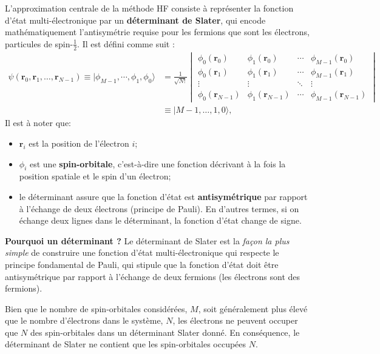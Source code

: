 \documentclass[12pt,a4paper]{article} %
\numberwithin{equation}{section} %
\numberwithin{figure}{section} %
\numberwithin{table}{section} %
\begin{document}
L'approximation centrale de la méthode HF consiste à représenter la fonction d'état multi-électronique par un \textbf{déterminant de Slater}, qui encode mathématiquement l'antisymétrie requise pour les fermions que sont les électrons, particules de spin-$\frac12$. Il est défini comme suit :
\begin{equation}
\begin{split}
\psi(\mathbf{r}_0, \mathbf{r}_1, \ldots, \mathbf{r}_{N-1})\equiv |\phi_{M-1},\cdots,  \phi_1, \phi_0 \rangle 
&=   \frac{1}{\sqrt{N!}}
\begin{vmatrix} \phi_0(\mathbf{r}_0) & \phi_1(\mathbf{r}_0) & \cdots & \phi_{M-1}(\mathbf{r}_0) \\
      \phi_0(\mathbf{r}_1) & \phi_1(\mathbf{r}_1) & \cdots & \phi_{M-1}(\mathbf{r}_1) \\
      \vdots & \vdots & \ddots & \vdots \\
      \phi_0(\mathbf{r}_{N-1}) & \phi_1(\mathbf{r}_{N-1}) & \cdots & \phi_{M-1}(\mathbf{r}_{N-1})
\end{vmatrix} \\
&\equiv |M-1,\dots, 1, 0 \rangle,
\end{split}
\end{equation} 
Il est à noter que:
\begin{itemize}
\item $\mathbf{r}_i$ est la position de l'électron $i$;
\item $\phi_i$ est une \textbf{spin-orbitale}, c'est-à-dire une fonction décrivant à la fois la position spatiale et le spin d'un électron;
\item le déterminant assure que la fonction d'état est \textbf{antisymétrique} par rapport à l'échange de deux électrons (principe de Pauli). En d'autres termes, si on échange deux lignes dans le déterminant, la fonction d'état change de signe.
\end{itemize}

\textbf{Pourquoi un déterminant ?} Le déterminant de Slater est la \textit{façon la plus simple} de construire une fonction d'état multi-électronique qui respecte le principe fondamental de Pauli, qui stipule que la fonction d'état doit être antisymétrique par rapport à l'échange de deux fermions (les électrons sont des fermions).

Bien que le nombre de spin-orbitales considérées, $M$, soit généralement plus élevé que le nombre d'électrons dans le système, $N$, les électrons ne peuvent occuper que $N$ des spin-orbitales dans un déterminant Slater donné. En conséquence, le déterminant de Slater ne contient que les spin-orbitales occupées $N$.
\end{document}
